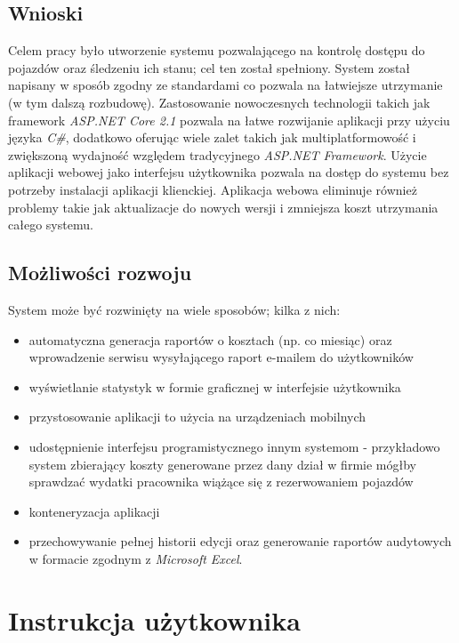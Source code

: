 \documentclass[eng,printmode,openany]{mgr}
\begin{document}
	\section{Wnioski}
	Celem pracy było utworzenie systemu pozwalającego na kontrolę dostępu do pojazdów oraz śledzeniu ich stanu; cel ten został spełniony. System został napisany w sposób zgodny ze standardami co pozwala na łatwiejsze utrzymanie (w tym dalszą rozbudowę). Zastosowanie nowoczesnych technologii takich jak framework \textit{ASP.NET Core 2.1} pozwala na łatwe rozwijanie aplikacji przy użyciu języka \textit{C\#}, dodatkowo oferując wiele zalet takich jak multiplatformowość i zwiększoną wydajność względem tradycyjnego \textit{ASP.NET Framework}. Użycie aplikacji webowej jako interfejsu użytkownika pozwala na dostęp do systemu bez potrzeby instalacji aplikacji klienckiej. Aplikacja webowa eliminuje również problemy takie jak aktualizacje do nowych wersji i zmniejsza koszt utrzymania całego systemu.
	
	\section{Możliwości rozwoju}
	System może być rozwinięty na wiele sposobów; kilka z nich:
	\begin{itemize}
		\item automatyczna generacja raportów o kosztach (np. co miesiąc) oraz wprowadzenie serwisu wysyłającego raport e-mailem do użytkowników 
		\item wyświetlanie statystyk w formie graficznej w interfejsie użytkownika
		\item przystosowanie aplikacji to użycia na urządzeniach mobilnych
		\item udostępnienie interfejsu programistycznego innym systemom - przykładowo system zbierający koszty generowane przez dany dział w firmie mógłby sprawdzać wydatki pracownika wiążące się z rezerwowaniem pojazdów
		\item konteneryzacja aplikacji
		\item przechowywanie pełnej historii edycji oraz generowanie raportów audytowych w formacie zgodnym z \textit{Microsoft Excel}.
	\end{itemize}
	
	
	\chapter{Instrukcja użytkownika}
\end{document}
